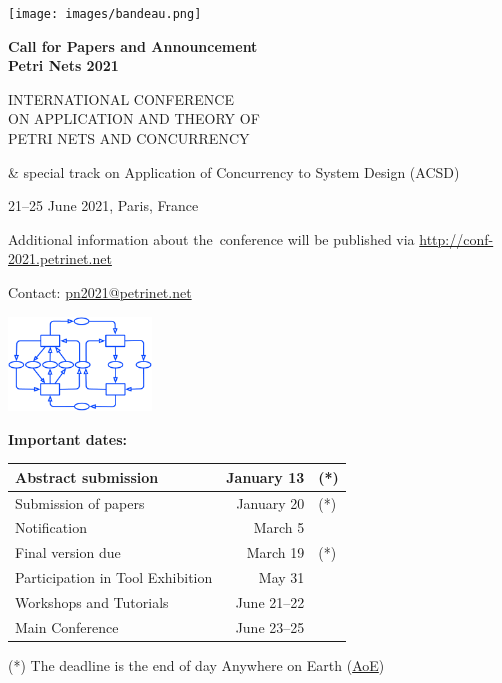 \documentclass[10pt,a4paper]{article}
\begin{document}
\mbox{}

\vspace{-1cm}\hspace{-1.5cm}\texttt{[image: images/bandeau.png]}
\begin{multicols}{2}
\begin{center}
{\large\bf
Call for Papers and Announcement\\
Petri Nets 2021

\bigskip

 INTERNATIONAL CONFERENCE\\
ON APPLICATION AND THEORY OF \\
PETRI NETS AND CONCURRENCY

\smallskip

\& special track on Application of Concurrency to System Design (ACSD)
\bigskip

21--25 June 2021, Paris, France}

\bigskip

Additional information about the conference will be published via
\url{http://conf-2021.petrinet.net}

\smallskip

Contact: \href{mailto:pn2021@petrinet.net}{pn2021@petrinet.net}
\end{center}

\columnbreak

\begin{center}
\includegraphics[height=2.5cm]{logos/LogoPN.pdf}

{\bf Important dates:}

\begin{tabular}{|l|r@{, 2021 }l|}
\hline
Abstract submission & January 13 & (*) \\
\hline
Submission of papers & January 20 & (*) \\
\hline
Notification & March 5 & \\
\hline
Final version due & March 19 & (*) \\
\hline
Participation in Tool Exhibition & May 31 & \\
\hline
Workshops and Tutorials & June 21--22 & \\
\hline
Main Conference & June 23--25 & \\
\hline
\end{tabular}

{\small (*) The deadline is the end of day Anywhere on Earth (\href{https://en.wikipedia.org/wiki/Anywhere_on_Earth}{AoE})}
\end{center}
\end{multicols}
\end{document}
